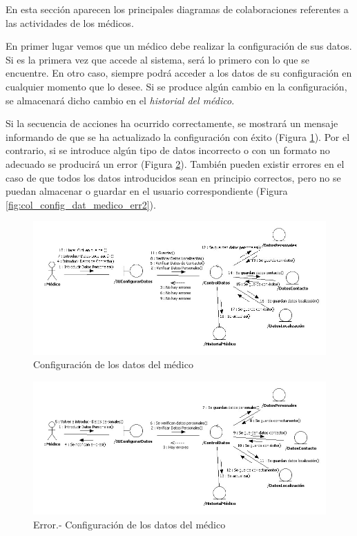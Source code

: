 		En esta sección aparecen los principales diagramas de colaboraciones referentes a las actividades de los médicos.
		
		En primer lugar vemos que un médico debe realizar la configuración de sus datos. Si es la primera vez que accede al sistema, será lo primero con lo que se encuentre. En otro caso, siempre podrá acceder a los datos de su configuración en cualquier momento que lo desee. Si se produce algún cambio en la configuración, se almacenará dicho cambio en el \textit{historial del médico}. 
		
		Si la secuencia de acciones ha ocurrido correctamente, se mostrará un mensaje informando de que se ha actualizado la configuración con éxito (Figura \ref{fig:col_config_dat_medico}). Por el contrario, si se introduce algún tipo de datos incorrecto o con un formato no adecuado se producirá un error (Figura \ref{fig:col_config_dat_medico_err}). También pueden existir errores en el caso de que todos los datos introducidos sean en principio correctos, pero no se puedan almacenar o guardar en el usuario correspondiente (Figura \ref{fig:col_config_dat_medico_err2}).
		\bigskip
		
		\begin{figure}[H]
		  \centering
		    \includegraphics[width=16cm]{img/jpg/colaboraciones/1_ConfiguracionDatosMedico.jpg}
		  \caption{Configuración de los datos del médico}
		  \label{fig:col_config_dat_medico}
		\end{figure}
		
		\bigskip
		\bigskip
		\bigskip
		\begin{figure}[H]
		  \centering
		    \includegraphics[width=16cm]{img/jpg/colaboraciones/2_ConfiguracionDatosMedicoError1.jpg}
		  \caption{Error.- Configuración de los datos del médico}
		  \label{fig:col_config_dat_medico_err}
		\end{figure}
		
